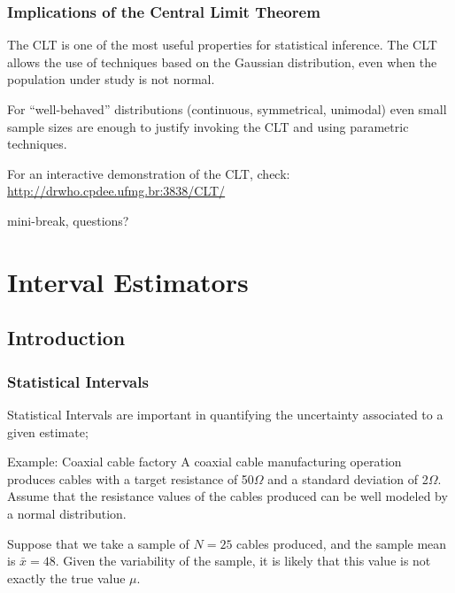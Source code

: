 \documentclass[10pt]{beamer}
\begin{document}
\begin{frame}
  \frametitle{Implications of the Central Limit Theorem} 

  The CLT is one of the most useful properties for statistical
  inference. The CLT allows the use of techniques based on the
  Gaussian distribution, even when the population under study is not
  normal.

  \bigskip
  
  For ``well-behaved'' distributions (continuous, symmetrical,
  unimodal) even small sample sizes are enough to justify invoking the
  CLT and using parametric techniques. 

  \bigskip

  For an interactive demonstration of the CLT, check:
  \url{http://drwho.cpdee.ufmg.br:3838/CLT/}
\end{frame}


\begin{frame}
  \begin{center}
    mini-break, questions?
  \end{center}
\end{frame}


\section{Interval Estimators}
\subsection{Introduction}
\begin{frame}
  \frametitle{Statistical Intervals} 

  Statistical Intervals are important in quantifying the uncertainty
  associated to a given estimate;

  \bigskip
  
  \begin{exampleblock}{Example: Coaxial cable factory}
    A coaxial cable manufacturing operation produces cables with a
    target resistance of 50$\Omega$ and a standard deviation of
    2$\Omega$. Assume that the resistance values of the cables
    produced can be well modeled by a normal distribution.
  \end{exampleblock}
  \begin{exampleblock}{}
    Suppose that we take a sample of $N = 25$ cables produced, and the
    sample mean is $\bar{x} = 48$. Given the variability of the
    sample, it is likely that this value is not exactly the true value
    $\mu$. 

    \medskip

  \end{exampleblock}
\end{frame}
\end{document}

